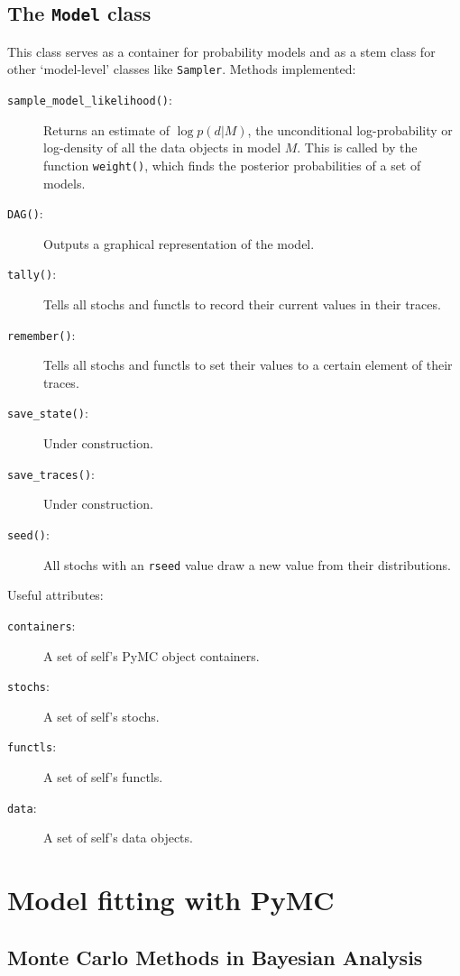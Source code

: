 \documentclass[]{book}
\begin{document}
\section{The \texttt{Model} class} \label{sec:Model} 
This class serves as a container for probability models and as a stem class for other `model-level' classes like \texttt{Sampler}. Methods implemented:
\begin{description}
	\item[\texttt{sample\_model\_likelihood()}:] Returns an estimate of $\log p(d|M)$, the unconditional log-probability or log-density of all the data objects in model $M$. This is called by the function \texttt{weight()}, which finds the posterior probabilities of a set of models.
	\item[\texttt{DAG()}:] Outputs a graphical representation of the model.
	\item[\texttt{tally()}:] Tells all stochs and functls to record their current values in their traces.
	\item[\texttt{remember()}:] Tells all stochs and functls to set their values to a certain element of their traces.
	\item[\texttt{save\_state()}:] Under construction.
	\item[\texttt{save\_traces()}:] Under construction.
	\item[\texttt{seed()}:] All stochs with an \texttt{rseed} value draw a new value from their distributions.
\end{description}

Useful attributes:
\begin{description}
	\item[\texttt{containers}:] A set of self's PyMC object containers.
	\item[\texttt{stochs}:] A set of self's stochs.
	\item[\texttt{functls}:] A set of self's functls.
	\item[\texttt{data}:] A set of self's data objects.
\end{description}

\chapter{Model fitting with PyMC} %
\label{chap:MCMC}


\section{Monte Carlo Methods in Bayesian Analysis}
\end{document}
